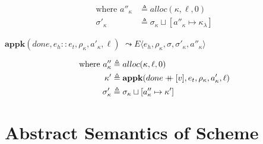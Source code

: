 \documentclass[12pt,draft]{article}
\newcommand\mdoubleplus{\ensuremath{\mathbin{+\mkern-9mu+}}}
\begin{document}
\begin{multicols*}{2}
\begin{align*}
  \text{where }
  a''_\kappa &\triangleq alloc(\kappa, \ell, 0) \\
  \sigma'_\kappa &\triangleq \sigma_\kappa \sqcup [a''_\kappa \mapsto \kappa_\lambda]
\end{align*}
\begin{center}
  $\textbf{appk}(done, e_h::e_t, \rho_\kappa, a'_\kappa, \ell)$
  $\leadsto E\langle e_h , \rho_\kappa , \sigma ,\sigma'_\kappa,a''_\kappa \rangle$
\end{center}
\vspace{-7mm}
\begin{align*}
  \text{where }
  a''_\kappa &\triangleq alloc(\kappa, \ell, 0) \\
  \kappa' &\triangleq \textbf{appk}(done \mdoubleplus [v] , e_t , \rho_\kappa , a'_\kappa, \ell) \\
  \sigma'_\kappa &\triangleq \sigma_\kappa \sqcup [a''_\kappa \mapsto \kappa']
\end{align*}
\end{multicols*}



\newpage
\section{Abstract Semantics of Scheme}
\end{document}
